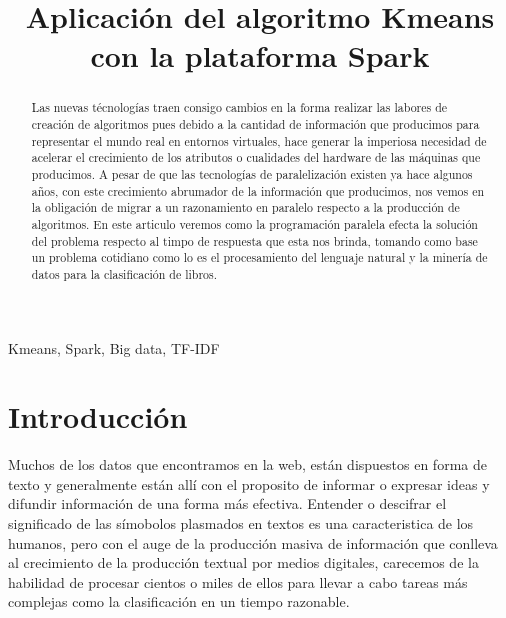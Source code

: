 \documentclass[conference,compsoc]{IEEEtran}
\begin{document}
\title{Aplicación del algoritmo Kmeans con la plataforma Spark}

\author{
    \and
}

\maketitle

\begin{IEEEkeywords}
    Kmeans, Spark, Big data, TF-IDF
\end{IEEEkeywords}

\vspace{0.5cm}

\begin{abstract}
Las nuevas técnologías traen consigo cambios en la forma realizar las labores
de creación de algoritmos pues debido a la cantidad de información que
producimos para representar el mundo real en entornos virtuales, hace generar
la imperiosa necesidad de acelerar el crecimiento de los atributos o cualidades
del hardware de las máquinas que producimos. A pesar de que las tecnologías de
paralelización existen ya hace algunos años, con este crecimiento abrumador de
la información que producimos, nos vemos en la obligación de migrar a un
razonamiento en paralelo respecto a la producción de algoritmos. En este
articulo veremos como la programación paralela efecta la solución del problema
respecto al timpo de respuesta que esta nos brinda, tomando como base un
problema cotidiano como lo es el procesamiento del lenguaje natural y la
minería de datos para la clasificación de libros.
\end{abstract}

\section{Introducción}
Muchos de los datos que encontramos en la web, están dispuestos en forma de
texto y generalmente están allí  con el proposito de informar o expresar ideas
y difundir información de una forma más efectiva. Entender o descifrar  el
significado de las símobolos plasmados en textos es una caracteristica de los
humanos, pero con el auge de la producción masiva de información que conlleva
al crecimiento de la producción textual por medios digitales, carecemos de la
habilidad de procesar cientos o miles de ellos para llevar a cabo tareas más
complejas como la clasificación en un tiempo razonable.\\
\end{document}
